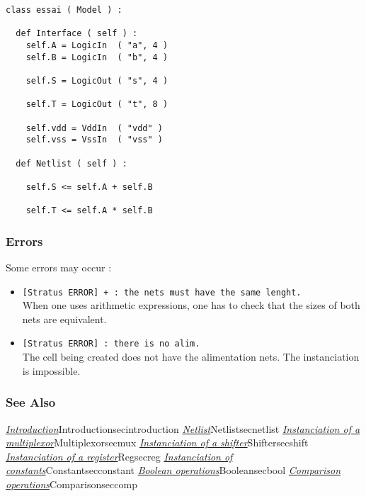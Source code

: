 \begin{verbatim}
class essai ( Model ) :

  def Interface ( self ) :
    self.A = LogicIn  ( "a", 4 )
    self.B = LogicIn  ( "b", 4 )
    
    self.S = LogicOut ( "s", 4 )
    
    self.T = LogicOut ( "t", 8 )

    self.vdd = VddIn  ( "vdd" )
    self.vss = VssIn  ( "vss" )
	
  def Netlist ( self ) :

    self.S <= self.A + self.B

    self.T <= self.A * self.B
\end{verbatim}
    
\subsubsection{Errors}
    
Some errors may occur :
\begin{itemize}
    \item \verb-[Stratus ERROR] + : the nets must have the same lenght.-\\When one uses arithmetic expressions, one has to check that the sizes of both nets are equivalent.
    \item \verb-[Stratus ERROR] : there is no alim.-\\The cell being created does not have the alimentation nets. The instanciation is impossible.
\end{itemize}

\subsubsection{See Also}

\hyperref[ref]{\emph{Introduction}}{}{Introduction}{secintroduction}
\hyperref[ref]{\emph{Netlist}}{}{Netlist}{secnetlist}
\hyperref[ref]{\emph{Instanciation of a multiplexor}}{}{Multiplexor}{secmux}
\hyperref[ref]{\emph{Instanciation of a shifter}}{}{Shifter}{secshift}
\hyperref[ref]{\emph{Instanciation of a register}}{}{Reg}{secreg}
\hyperref[ref]{\emph{Instanciation of constants}}{}{Constant}{secconstant}
\hyperref[ref]{\emph{Boolean operations}}{}{Boolean}{secbool}
\hyperref[ref]{\emph{Comparison operations}}{}{Comparison}{seccomp}
